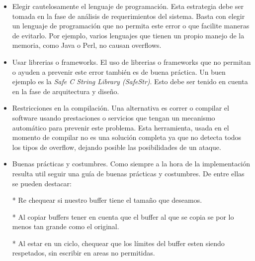 \begin{itemize}
    \item Elegir cautelosamente el lenguaje de programación. Esta estrategia debe ser tomada en la fase de análisis de requerimientos del sistema.
	Basta con elegir un lenguaje de programación que no permita este error o que facilite maneras de evitarlo.
	Por ejemplo, varios lenguajes que tienen un propio manejo de la memoria, como Java o Perl, no causan overflows.
    \item Usar librerias o frameworks.
	El uso de librerias o frameworks que no permitan o ayuden a prevenir este error también es de buena práctica.
	Un buen ejemplo es la \textit{Safe C String Library (SafeStr)}.
	Esto debe ser tenido en cuenta en la fase de arquitectura y diseño.
    \item Restricciones en la compilación.
	Una alternativa es correr o compilar el software usando prestaciones o servicios que tengan un mecanismo automático para prevenir este problema.
	Esta herramienta, usada en el momento de compilar no es una solución completa ya que no detecta todos los tipos de overflow, dejando posible las posibilidades de un ataque.
    \item Buenas prácticas y costumbres.
	Como siempre a la hora de la implementación resulta util seguir una guía de buenas prácticas y costumbres.
	De entre ellas se pueden destacar:

	* Re chequear si nuestro buffer tiene el tamaño que deseamos.

	* Al copiar buffers tener en cuenta que el buffer al que se copia se por lo menos tan grande como el original.

	* Al estar en un ciclo, chequear que los límites del buffer esten siendo respetados, sin escribir en areas no permitidas.


\end{itemize}
